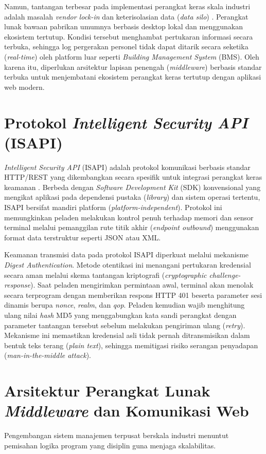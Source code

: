 Namun, tantangan terbesar pada implementasi perangkat keras skala industri adalah masalah \textit{vendor lock-in} dan keterisolasian data (\textit{data silo}) \autocite{s19020229}. Perangkat lunak bawaan pabrikan umumnya berbasis desktop lokal dan menggunakan ekosistem tertutup. Kondisi tersebut menghambat pertukaran informasi secara terbuka, sehingga log pergerakan personel tidak dapat ditarik secara seketika (\textit{real-time}) oleh platform luar seperti \textit{Building Management System} (BMS). Oleh karena itu, diperlukan arsitektur lapisan penengah (\textit{middleware}) berbasis standar terbuka untuk menjembatani ekosistem perangkat keras tertutup dengan aplikasi web modern.

\section{Protokol \textit{Intelligent Security API} (ISAPI)}
\textit{Intelligent Security API} (ISAPI) adalah protokol komunikasi berbasis standar HTTP/REST yang dikembangkan secara spesifik untuk integrasi perangkat keras keamanan \autocite{hikvision_isapi_person}. Berbeda dengan \textit{Software Development Kit} (SDK) konvensional yang mengikat aplikasi pada dependensi pustaka (\textit{library}) dan sistem operasi tertentu, ISAPI bersifat mandiri platform (\textit{platform-independent}). Protokol ini memungkinkan peladen melakukan kontrol penuh terhadap memori dan sensor terminal melalui pemanggilan rute titik akhir (\textit{endpoint outbound}) menggunakan format data terstruktur seperti JSON atau XML.

Keamanan transmisi data pada protokol ISAPI diperkuat melalui mekanisme \textit{Digest Authentication}. Metode otentikasi ini menangani pertukaran kredensial secara aman melalui skema tantangan kriptografi (\textit{cryptographic challenge-response}). Saat peladen mengirimkan permintaan awal, terminal akan menolak secara terprogram dengan memberikan respons HTTP 401 beserta parameter sesi dinamis berupa \textit{nonce}, \textit{realm}, dan \textit{qop}. Peladen kemudian wajib menghitung ulang nilai \textit{hash} MD5 yang menggabungkan kata sandi perangkat dengan parameter tantangan tersebut sebelum melakukan pengiriman ulang (\textit{retry}). Mekanisme ini memastikan kredensial asli tidak pernah ditransmisikan dalam bentuk teks terang (\textit{plain text}), sehingga memitigasi risiko serangan penyadapan (\textit{man-in-the-middle attack}).

\section{Arsitektur Perangkat Lunak \textit{Middleware} dan Komunikasi Web}
Pengembangan sistem manajemen terpusat berskala industri menuntut pemisahan logika program yang disiplin guna menjaga skalabilitas.

